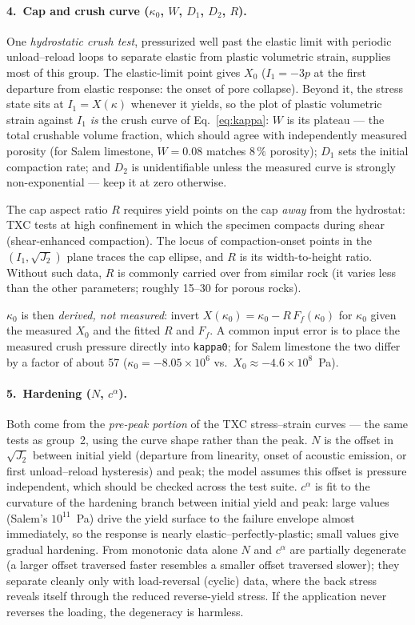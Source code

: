 \documentclass[12pt]{article}
\begin{document}
\paragraph{4.\ Cap and crush curve
($\kappa_0$, $W$, $D_1$, $D_2$, $R$).}
One \emph{hydrostatic crush test}, pressurized well past the elastic
limit with periodic unload--reload loops to separate elastic from
plastic volumetric strain, supplies most of this group. The
elastic-limit point gives $X_0$ ($I_1 = -3p$ at the first departure
from elastic response: the onset of pore collapse). Beyond it, the
stress state sits at $I_1 = X(\kappa)$ whenever it yields, so the
plot of plastic volumetric strain against $I_1$ \emph{is} the crush
curve of Eq.~\eqref{eq:kappa}: $W$ is its plateau --- the total
crushable volume fraction, which should agree with independently
measured porosity (for Salem limestone, $W = 0.08$ matches
$8\,\%$ porosity); $D_1$ sets the initial compaction rate; and $D_2$
is unidentifiable unless the measured curve is strongly
non-exponential --- keep it at zero otherwise.

The cap aspect ratio $R$ requires yield points on the cap \emph{away}
from the hydrostat: TXC tests at high confinement in which the
specimen compacts during shear (shear-enhanced compaction). The
locus of compaction-onset points in the $(I_1, \sqrt{J_2})$ plane
traces the cap ellipse, and $R$ is its width-to-height ratio.
Without such data, $R$ is commonly carried over from similar rock
(it varies less than the other parameters; roughly 15--30 for porous
rocks).

$\kappa_0$ is then \emph{derived, not measured}: invert
$X(\kappa_0) = \kappa_0 - R\,F_f(\kappa_0)$ for $\kappa_0$ given the
measured $X_0$ and the fitted $R$ and $F_f$. A common input error is
to place the measured crush pressure directly into \texttt{kappa0};
for Salem limestone the two differ by a factor of about 57
($\kappa_0 = -8.05 \times 10^{6}$ vs.\
$X_0 \approx -4.6 \times 10^{8}$~Pa).

\paragraph{5.\ Hardening ($N$, $c^\alpha$).}
Both come from the \emph{pre-peak portion} of the TXC stress--strain
curves --- the same tests as group~2, using the curve shape rather
than the peak. $N$ is the offset in $\sqrt{J_2}$ between initial
yield (departure from linearity, onset of acoustic emission, or first
unload--reload hysteresis) and peak; the model assumes this offset is
pressure independent, which should be checked across the test suite.
$c^\alpha$ is fit to the curvature of the hardening branch between
initial yield and peak: large values (Salem's $10^{11}$~Pa) drive the
yield surface to the failure envelope almost immediately, so the
response is nearly elastic--perfectly-plastic; small values give
gradual hardening. From monotonic data alone $N$ and $c^\alpha$ are
partially degenerate (a larger offset traversed faster resembles a
smaller offset traversed slower); they separate cleanly only with
load-reversal (cyclic) data, where the back stress reveals itself
through the reduced reverse-yield stress. If the application never
reverses the loading, the degeneracy is harmless.
\end{document}
